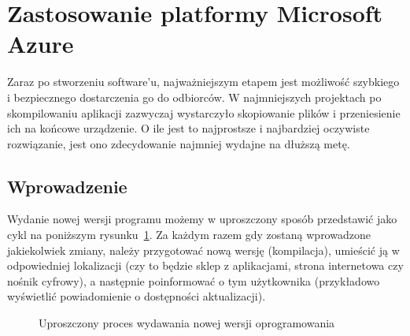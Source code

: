 \section{Zastosowanie platformy Microsoft Azure}


Zaraz po stworzeniu software'u, najważniejszym etapem jest możliwość szybkiego i bezpiecznego dostarczenia go do odbiorców.
W najmniejszych projektach po skompilowaniu aplikacji zazwyczaj wystarczyło skopiowanie plików
i przeniesienie ich na końcowe urządzenie. O ile jest to najprostsze i najbardziej oczywiste rozwiązanie,
jest ono zdecydowanie najmniej wydajne na dłuższą metę.

\subsection[pipelineIntro]{Wprowadzenie}
Wydanie nowej wersji programu możemy w uproszczony sposób przedstawić jako cykl na poniższym rysunku~\ref{fig:cyklZmian}.
Za każdym razem gdy zostaną wprowadzone jakiekolwiek zmiany, należy przygotować nową wersję (kompilacja),
umieścić ją w odpowiedniej lokalizacji (czy to będzie sklep z aplikacjami, strona internetowa czy nośnik cyfrowy),
a następnie poinformować o tym użytkownika (przykładowo wyświetlić powiadomienie o dostępności aktualizacji).


\begin{figure}[!htp]
    \centering
    \caption{Uproszczony proces wydawania nowej wersji oprogramowania}
    \label{fig:cyklZmian}
\end{figure}

